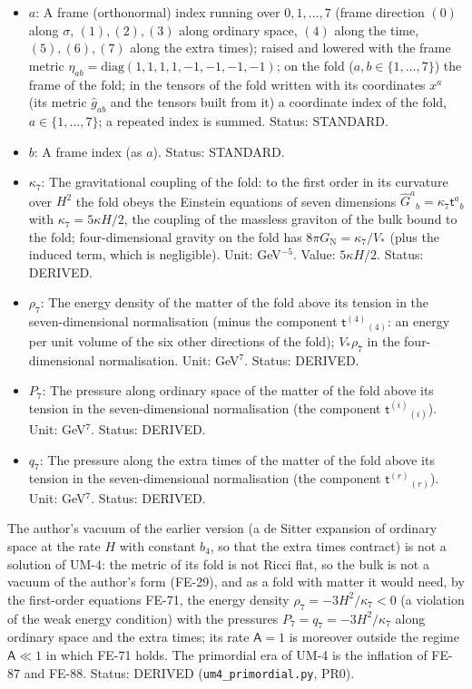 \documentclass[
  10pt,
]{article}
\begin{document}
\begin{itemize}
  the four-dimensional metric \(\hat h_{\mu\nu}\). Unit: 1/length\(^2\).
  Status: STANDARD.
\item
  \(a\): A frame (orthonormal) index running over \(0, 1, \dots, 7\)
  (frame direction \((0)\) along \(\sigma\), \((1), (2), (3)\) along
  ordinary space, \((4)\) along the time, \((5), (6), (7)\) along the
  extra times); raised and lowered with the frame metric
  \(\eta_{ab} = \mathrm{diag}(1, 1, 1, 1, -1, -1, -1, -1)\); on the fold
  (\(a, b \in \{1, \dots, 7\}\)) the frame of the fold; in the tensors
  of the fold written with its coordinates \(x^a\) (its metric
  \(\hat g_{ab}\) and the tensors built from it) a coordinate index of
  the fold, \(a \in \{1, \dots, 7\}\); a repeated index is summed.
  Status: STANDARD.
\item
  \(b\): A frame index (as \(a\)). Status: STANDARD.
\item
  \(\kappa_7\): The gravitational coupling of the fold: to the first
  order in its curvature over \(H^2\) the fold obeys the Einstein
  equations of seven dimensions
  \(\hat G^a{}_b = \kappa_7\mathsf{t}^a{}_b\) with
  \(\kappa_7 = 5\kappa H/2\), the coupling of the massless graviton of
  the bulk bound to the fold; four-dimensional gravity on the fold has
  \(8\pi G_{\mathrm{N}} = \kappa_7/V_*\) (plus the induced term, which
  is negligible). Unit: GeV\(^{-5}\). Value: \(5\kappa H/2\). Status:
  DERIVED.
\item
  \(\rho_7\): The energy density of the matter of the fold above its
  tension in the seven-dimensional normalisation (minus the component
  \(\mathsf{t}^{(4)}{}_{(4)}\): an energy per unit volume of the six
  other directions of the fold); \(V_*\rho_7\) in the four-dimensional
  normalisation. Unit: GeV\(^7\). Status: DERIVED.
\item
  \(P_7\): The pressure along ordinary space of the matter of the fold
  above its tension in the seven-dimensional normalisation (the
  component \(\mathsf{t}^{(i)}{}_{(i)}\)). Unit: GeV\(^7\). Status:
  DERIVED.
\item
  \(q_7\): The pressure along the extra times of the matter of the fold
  above its tension in the seven-dimensional normalisation (the
  component \(\mathsf{t}^{(r)}{}_{(r)}\)). Unit: GeV\(^7\). Status:
  DERIVED.
\end{itemize}

The author's vacuum of the earlier version (a de Sitter expansion of
ordinary space at the rate \(H\) with constant \(b_4\), so that the
extra times contract) is not a solution of UM-4: the metric of its fold
is not Ricci flat, so the bulk is not a vacuum of the author's form
(FE-29), and as a fold with matter it would need, by the first-order
equations FE-71, the energy density \(\rho_7 = -3H^2/\kappa_7 < 0\) (a
violation of the weak energy condition) with the pressures
\(P_7 = q_7 = -3H^2/\kappa_7\) along ordinary space and the extra times;
its rate \(\mathsf{A} = 1\) is moreover outside the regime
\(\mathsf{A} \ll 1\) in which FE-71 holds. The primordial era of UM-4 is
the inflation of FE-87 and FE-88. Status: DERIVED
(\texttt{um4\_primordial.py}, PR0).
\end{document}

